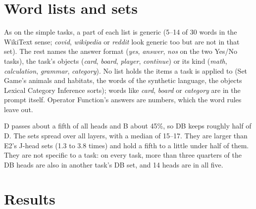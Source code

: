 \documentclass[10pt,a4paper]{article}
\begin{document}
\section{Word lists and sets}

\begin{table}[H]\centering\scriptsize

\caption{D's word lists, most active first. Generic (italics): among the 50 words heads decode most on WikiText under J-head (E8's definition).}
\label{tab:lists}
\end{table}

As on the simple tasks, a part of each list is generic (5--14 of 30 words in the WikiText sense; \emph{covid}, \emph{wikipedia} or \emph{reddit} look generic too but are not in that set). The rest names the answer format (\emph{yes}, \emph{answer}, \emph{nos} on the two Yes/No tasks), the task's objects (\emph{card}, \emph{board}, \emph{player}, \emph{continue}) or its kind (\emph{math}, \emph{calculation}, \emph{grammar}, \emph{category}). No list holds the items a task is applied to (Set Game's animals and habitats, the words of the synthetic language, the objects Lexical Category Inference sorts); words like \emph{card}, \emph{board} or \emph{category} are in the prompt itself. Operator Function's answers are numbers, which the word rules leave out.

\begin{table}[H]\centering\small
\resizebox{\linewidth}{!}{}
\caption{Heads per filter and in DB (1{,}024 heads in all); layers of the DB heads. In E2 J / L: DB heads in E2's rule-style J-head / Logit-head set, out of that set's size. In another DB: DB heads also in the DB set of at least one other task; in all DB: heads in all five DB sets.}
\label{tab:sets}
\end{table}

D passes about a fifth of all heads and B about 45\%, so DB keeps roughly half of D. The sets spread over all layers, with a median of 15--17. They are larger than E2's J-head sets (1.3 to 3.8 times) and hold a fifth to a little under half of them. They are not specific to a task: on every task, more than three quarters of the DB heads are also in another task's DB set, and 14 heads are in all five.

\section{Results}
\end{document}
